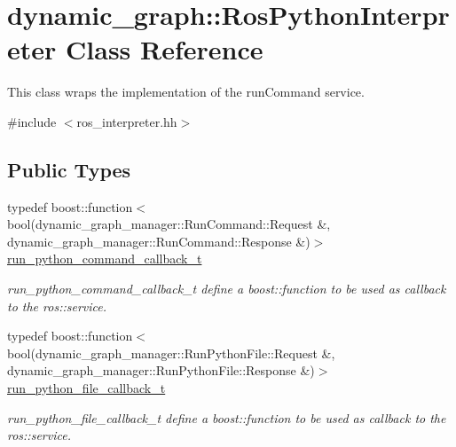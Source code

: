 \hypertarget{classdynamic__graph_1_1RosPythonInterpreter}{}\section{dynamic\+\_\+graph\+:\+:Ros\+Python\+Interpreter Class Reference}
\label{classdynamic__graph_1_1RosPythonInterpreter}


This class wraps the implementation of the run\+Command service.  




{\ttfamily \#include $<$ros\+\_\+interpreter.\+hh$>$}

\subsection*{Public Types}
\begin{DoxyCompactItemize}
\item 
typedef boost\+::function$<$ bool(dynamic\+\_\+graph\+\_\+manager\+::\+Run\+Command\+::\+Request \&, dynamic\+\_\+graph\+\_\+manager\+::\+Run\+Command\+::\+Response \&)$>$ \hyperlink{classdynamic__graph_1_1RosPythonInterpreter_aa9fcb34973d84db722fa39803d11c00d}{run\+\_\+python\+\_\+command\+\_\+callback\+\_\+t}
\begin{DoxyCompactList}\small\item\em run\+\_\+python\+\_\+command\+\_\+callback\+\_\+t define a boost\+::function to be used as callback to the ros\+::service. \end{DoxyCompactList}\item 
typedef boost\+::function$<$ bool(dynamic\+\_\+graph\+\_\+manager\+::\+Run\+Python\+File\+::\+Request \&, dynamic\+\_\+graph\+\_\+manager\+::\+Run\+Python\+File\+::\+Response \&)$>$ \hyperlink{classdynamic__graph_1_1RosPythonInterpreter_a802128e670817aa48dd8db54830a7977}{run\+\_\+python\+\_\+file\+\_\+callback\+\_\+t}
\begin{DoxyCompactList}\small\item\em run\+\_\+python\+\_\+file\+\_\+callback\+\_\+t define a boost\+::function to be used as callback to the ros\+::service. \end{DoxyCompactList}\end{DoxyCompactItemize}
